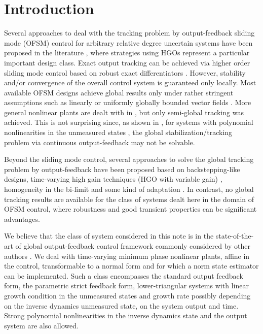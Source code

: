 \documentclass{rncauth}
\begin{document}

\section{Introduction} 

Several approaches to deal with the tracking problem by
output-feedback sliding mode (OFSM) control for arbitrary relative
degree uncertain systems have been proposed in the literature
\cite{HCCL:2002abook}\cite{HPCCL:2006book}\cite{ALS:04}\cite{HCCL:2002a}\cite{HPCCL:2006},
where strategies using HGOs \cite{OK:97}\cite{CHCL:2005} represent
a particular important design class. Exact output tracking can be
achieved via higher order sliding mode control based on robust
exact differentiators \cite{L:98}. However, stability and/or
convergence of the overall control system is guaranteed only
locally. Most available OFSM designs achieve global results only under
rather stringent assumptions such as linearly or uniformly
globally bounded vector fields
\cite{HCCL:2002a}\cite{HPCCL:2006}\cite{CHCL:2005}. More general
nonlinear plants are dealt with in
\cite{HPCCL:2006}\cite{OK:97}\cite{EK:92}\cite{OPNH:2007}, but
only semi-global tracking was achieved. This is not surprising
since, as shown in \cite{MPD:94}, for systems with polynomial
nonlinearities in the unmeasured states \cite{OK:97}\cite{TP:95},
the global stabilization/tracking problem via continuous
output-feedback may not be solvable.

Beyond the sliding mode control, several approaches to solve the
global tracking problem by output-feedback have been proposed
based on backstepping-like designs, time-varying high gain
techniques (HGO with variable gain)\cite{P:01}\cite{KKJ:02}
\cite{KKC:03}\cite{LL:05}\cite{AK:07}, homogeneity in the bi-limit
\cite{P:07}\cite{APA:09} and some kind of adaptation \cite{MT:95}.
In contrast, no global tracking results are available for the
class of systems dealt here in the domain of OFSM control, where
robustness and good transient properties can be significant
advantages.

We believe that the class of system considered in this note is in
the state-of-the-art of global output-feedback control framework
commonly considered by other authors
\cite{P:01}\cite{LL:05}\cite{P:07}\cite{APA:09}\cite{PJ:04}\cite{GAL:06}.
We deal with time-varying minimum phase nonlinear plants, affine
in the control, transformable to a normal form and for which a
norm state estimator can be implemented. Such a class encompasses
the standard output feedback form, the parametric strict feedback
form, lower-triangular systems with linear growth condition in the
unmeasured states and growth rate possibly depending on the
inverse dynamics unmeasured state, on the system output and time.
Strong polynomial nonlinearities in the inverse dynamics state and
the output system are also allowed.
\end{document}
